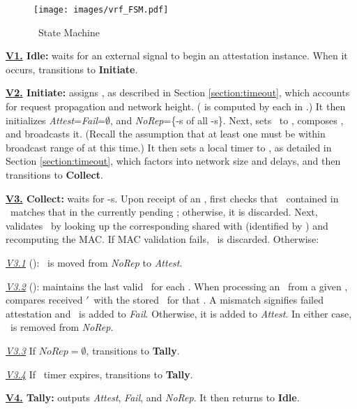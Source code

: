 %
\begin{figure}
    \centering
    \texttt{[image: images/vrf\_FSM.pdf]}
    \vspace{-.5em}
    \caption{\vrf\ State Machine}
    \label{fig:vrfFSM}
    \vspace{-1.5em}
\end{figure}
%
\begin{compactitem}[]
    \item {\bf \underline{\bf V1.} Idle:} \vrf waits for an external signal to begin an attestation instance. 
    When it occurs, \vrf transitions to \textbf{Initiate}.
    \item {\bf \underline{\bf V2.} Initiate:} \vrf assigns \attesttime{}, 
    as described in Section \ref{section:timeout}, which accounts for request 
    propagation and network height. (\attesttime{} is computed by each \prv in \trapsnortc.)     
    It then initializes 
    \textit{Attest}=\textit{Fail}=$\emptyset$, and \textit{NoRep}=\{\devid-s of all \prv-s\}. 
    Next, \vrf sets \snd\ to \vrf, composes \Attreq, and broadcasts it. (Recall the assumption 
    that at least one \prv must be within broadcast range of \vrf at this time.) 
    It then sets a local timer to \timeout{},
    as detailed in Section \ref{section:timeout}, which factors into network size and delays, 
    and then transitions to \textbf{Collect}.
    \item {\bf \underline{\bf V3.} Collect:} \vrf waits for \Attrep-s. 
    Upon receipt of an \Attrep, \vrf first checks that \hash\ contained in \Attrep\ matches that in the 
    currently pending \Attreq; otherwise, it is discarded. Next, \vrf validates \Attrep\ by 
    looking up the corresponding \key shared with \prv (identified by \devid) and recomputing 
    the MAC. If MAC validation fails, \Attrep\ is discarded. Otherwise:
    \begin{compactitem}[]
        \item {\it \underline{V3.1}} (\casu): \devid\ is moved from \textit{NoRep} to \textit{Attest}.
        \item {\it \underline{V3.2}} (\rata): \vrf maintains the last valid \lmt\ for each \prv. 
    When processing an \Attrep\ from a given \prv, \vrf compares received \lmt$'$\ with the stored 
    \lmt\ for that \prv. A mismatch signifies failed attestation and
    \devid\ is added to \textit{Fail}. Otherwise, it is added to \textit{Attest}. 
    In either case, \devid\ is removed from \textit{NoRep}.
        \item {\it \underline{V3.3}} If $\textit{NoRep}=\emptyset$, \vrf transitions to \textbf{Tally}.
        \item {\it \underline{V3.4}} If \timeout\ timer expires, \vrf transitions to \textbf{Tally}.
    \end{compactitem}
    \item {\bf \underline{\bf V4.} Tally:} \vrf outputs \textit{Attest}, \textit{Fail}, and 
    \textit{NoRep}. It then returns to \textbf{Idle}.
\end{compactitem}


